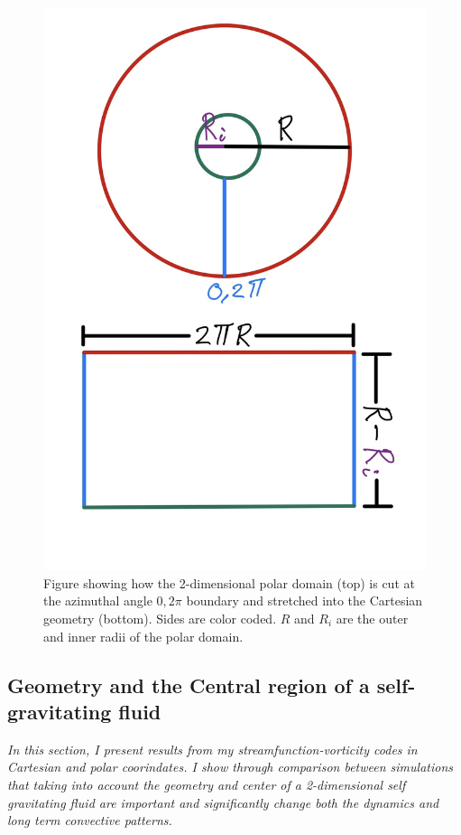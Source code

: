 \documentclass{article}
\begin{document}
\begin{figure}[h!]
	\centering
	\includegraphics[scale=0.25]{unrap image.jpg}
	\caption{Figure showing how the 2-dimensional polar domain (top) is cut at the azimuthal angle $0, 2\pi$ boundary and stretched into the Cartesian geometry (bottom). Sides are color coded. $R$ and $R_i$ are the outer and inner radii of the polar domain.} 
	\label{unrolling}
\end{figure}

\subsection*{Geometry and the Central region of a self-gravitating fluid}
{\it{In this section, I present results from my streamfunction-vorticity codes in Cartesian and polar coorindates. I show through comparison between simulations that taking into account the geometry and center of a 2-dimensional self gravitating fluid are important and significantly change both the dynamics and long term convective patterns.}}
\vspace{0.3cm}
\newline
\end{document}
